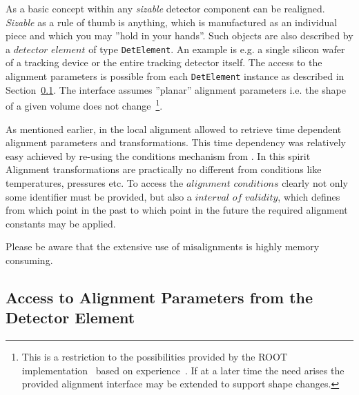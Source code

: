 \documentclass[10pt,a4paper]{article}
\begin{document}
\noindent
As a basic concept within \DDhep any {\it{sizable}} detector component
can be realigned. {\it{Sizable}} as a rule of thumb is anything, which 
is manufactured as an individual piece and which you may ''hold in your hands''.
Such objects are also described by a $detector$ $element$ of type {\tt DetElement}.
An example is e.g. a single silicon wafer of a tracking device or the entire
tracking detector itself.
The access to the alignment parameters is possible from each {\tt DetElement}
instance as described in Section~\ref{sec:ddalign-user-manual-misalignment-access}.
The interface assumes ''planar'' alignment parameters i.e. the shape of 
a given volume does not change~\footnote{This is a restriction to the 
possibilities provided by the ROOT implementation~\cite{bib:ROOT-tgeo}
based on experience~\cite{bib:chris-parkes-priv-comm}.
If at a later time the need arises the provided alignment interface may 
be extended to support shape changes.}.

\noindent
As mentioned earlier, in the local alignment \DDA allowed to retrieve 
time dependent alignment parameters and transformations. This time
dependency was relatively easy achieved by re-using the conditions 
mechanism from \DDC. In this spirit Alignment transformations are 
practically no different from conditions like temperatures, pressures etc.
To access the $alignment$ $conditions$ clearly not only some 
identifier must be provided, but also a $interval$ $of$ $validity$,
which defines from which point in the past to which point in the future
the required alignment constants may be applied.

\noindent
Please be aware that the extensive use of misalignments is highly memory
consuming.

\noindent
\subsection{Access to Alignment Parameters from the Detector Element}
\label{sec:ddalign-user-manual-misalignment-access}
\end{document}
